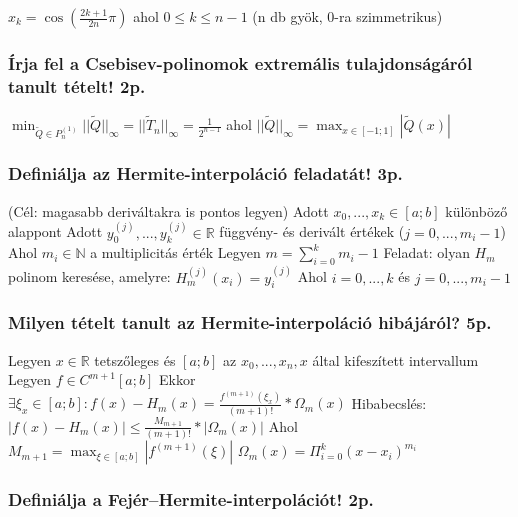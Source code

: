 \documentclass[12pt,a4paper]{article}
\begin{document}
$x_k = \cos(\frac{2k+1}{2n}\pi)$ ahol $0 \le k \le n-1$ \;\; (n db gyök, 0-ra szimmetrikus)

\subsubsection{Írja fel a Csebisev-polinomok extremális tulajdonságáról tanult tételt! 2p.}

$\min_{\widetilde{Q} \in P_n^{(1)}} ||\widetilde{Q}||_\infty = ||\widetilde{T}_n||_\infty = \frac{1}{2^{n-1}}$ ahol $||\widetilde{Q}||_\infty = \max_{x \in [-1;1]} |\widetilde{Q}(x)|$

\pagebreak

\subsubsection{Definiálja az Hermite-interpoláció feladatát! 3p.}

\begin{outline}
	\1 (Cél: magasabb deriváltakra is pontos legyen)
	\1 Adott $x_0,...,x_k \in [a;b]$ különböző alappont
	\1 Adott $y_0^{(j)},...,y_k^{(j)} \in \mathbb{R}$ függvény- és derivált értékek ($j=0,...,m_i-1$)
		\2 Ahol $m_i \in \mathbb{N}$ a multiplicitás érték
	\1 Legyen $m=\sum_{i=0}^{k} m_i - 1$
	\1 Feladat: olyan $H_m$ polinom keresése, amelyre: $H_m^{(j)}(x_i) = y_i^{(j)}$
		\2 Ahol $i=0,...,k$ és $j=0,...,m_i-1$
\end{outline}

\subsubsection{Milyen tételt tanult az Hermite-interpoláció hibájáról? 5p.}

\begin{outline}
	\1 Legyen $x \in \mathbb{R}$ tetszőleges és $[a;b]$ az $x_0,...,x_n,x$ által kifeszített intervallum
	\1 Legyen $f \in C^{m+1}[a;b]$
	\1 Ekkor $\exists \xi_x \in [a;b]: f(x)-H_m(x)=\frac{f^{(m+1)}(\xi_x)}{(m+1)!}*\Omega_m(x)$
	\1 Hibabecslés: $|f(x)-H_m(x)| \le \frac{M_{m+1}}{(m+1)!}*|\Omega_m(x)|$
		\2 Ahol $M_{m+1} = \max_{\xi \in [a;b]} |f^{(m+1)}(\xi)|$
		\2 $\Omega_m(x) = \Pi_{i=0}^k (x-x_i)^{m_i}$
\end{outline}

\subsubsection{Definiálja a Fejér--Hermite-interpolációt! 2p.}
\end{document}
